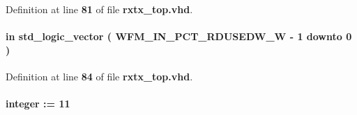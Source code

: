 Definition at line {\bf 81} of file {\bf rxtx\+\_\+top.\+vhd}.

\paragraph[{wfm\+\_\+in\+\_\+pct\+\_\+rdusedw}]{ {\bfseries \textcolor{keywordflow}{in}\textcolor{vhdlchar}{ }} {\bfseries \textcolor{comment}{std\+\_\+logic\+\_\+vector}\textcolor{vhdlchar}{ }\textcolor{vhdlchar}{(}\textcolor{vhdlchar}{ }\textcolor{vhdlchar}{ }\textcolor{vhdlchar}{ }\textcolor{vhdlchar}{ }{\bfseries {\bf W\+F\+M\+\_\+\+I\+N\+\_\+\+P\+C\+T\+\_\+\+R\+D\+U\+S\+E\+D\+W\+\_\+W}} \textcolor{vhdlchar}{-\/}\textcolor{vhdlchar}{ } \textcolor{vhdldigit}{1} \textcolor{vhdlchar}{ }\textcolor{keywordflow}{downto}\textcolor{vhdlchar}{ }\textcolor{vhdlchar}{ } \textcolor{vhdldigit}{0} \textcolor{vhdlchar}{ }\textcolor{vhdlchar}{)}\textcolor{vhdlchar}{ }} \hspace{0.3cm}{\ttfamily [Port]}}\label{classrxtx__top_a43c39c583692c2c68cb08c5a80a3a1e0}


Definition at line {\bf 84} of file {\bf rxtx\+\_\+top.\+vhd}.

\paragraph[{W\+F\+M\+\_\+\+I\+N\+\_\+\+P\+C\+T\+\_\+\+R\+D\+U\+S\+E\+D\+W\+\_\+W}]{ {\bfseries \textcolor{vhdlchar}{ }} {\bfseries \textcolor{comment}{integer}\textcolor{vhdlchar}{ }\textcolor{vhdlchar}{ }\textcolor{vhdlchar}{\+:}\textcolor{vhdlchar}{=}\textcolor{vhdlchar}{ }\textcolor{vhdlchar}{ } \textcolor{vhdldigit}{11} \textcolor{vhdlchar}{ }} \hspace{0.3cm}{\ttfamily [Generic]}}\label{classrxtx__top_a2399340e33836fa5e3c1916018f9be25}


